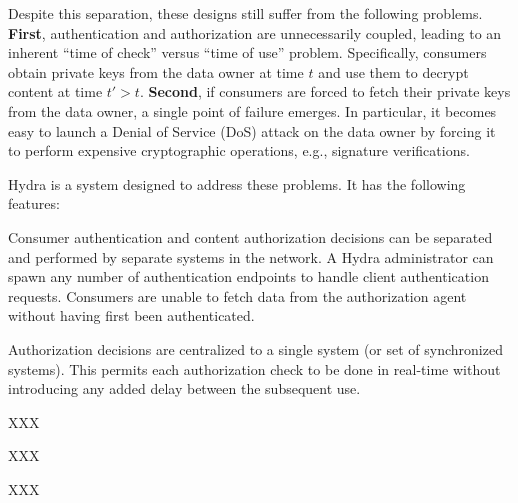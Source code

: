 Despite this separation, these designs still suffer from the following problems.
{\bf First}, authentication and authorization are unnecessarily coupled, leading
to an inherent ``time of check'' versus ``time of use'' problem. Specifically,
consumers obtain private keys from the data owner at time $t$ and use them to
decrypt content at time $t' > t$. {\bf Second}, if consumers are forced to fetch
their private keys from the data owner, a single point of failure emerges. In
particular, it becomes easy to launch a Denial of Service (DoS) attack on the
data owner by forcing it to perform expensive cryptographic operations, e.g.,
signature verifications.

Hydra is a system designed to address these problems. It has the following features:
%
\begin{compactitem}
    \item Consumer authentication and content authorization decisions can be separated
    and performed by separate systems in the network. A Hydra administrator can spawn
    any number of authentication endpoints to handle client authentication requests.
    Consumers are unable to fetch data from the authorization agent without having
    first been authenticated.
    \item Authorization decisions are centralized to a single system (or set of synchronized
    systems). This permits each authorization check to be done in real-time without
    introducing any added delay between the subsequent use.
    \item XXX
    \item XXX
    \item XXX
\end{compactitem}
%

